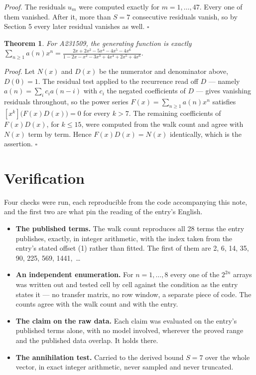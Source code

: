 \documentclass[11pt]{article}
\newtheorem{theorem}{Theorem}
\theoremstyle{definition}
\begin{document}
{\itshape Proof.} The residuals $u_m$ were computed exactly for $m = 1,\dots,47$. Every one of them vanished. After it, more than $S = 7$ consecutive residuals vanish, so by Section 5 every later residual vanishes as well. $\square$

\begin{theorem} For A231509, the generating function is exactly $\sum_{n\ge 1} a(n)x^n = \frac{2x + 2x^{2} - 5x^{4} - 4x^{5} - 4x^{6}}{1 - 2x - x^{2} - 3x^{3} + 4x^{4} + 2x^{5} + 4x^{6}}$.\end{theorem}

{\itshape Proof.} Let $N(x)$ and $D(x)$ be the numerator and denominator above, $D(0)=1$. The residual test applied to the recurrence read off $D$ --- namely $a(n) = \sum_i c_i a(n-i)$ with $c_i$ the negated coefficients of $D$ --- gives vanishing residuals throughout, so the power series $F(x)=\sum_{n\ge 1}a(n)x^n$ satisfies $[x^k]\bigl(F(x)D(x)\bigr) = 0$ for every $k > 7$. The remaining coefficients of $F(x)D(x)$, for $k \le 15$, were computed from the walk count and agree with $N(x)$ term by term. Hence $F(x)D(x) = N(x)$ identically, which is the assertion. $\square$

\section{Verification}

Four checks were run, each reproducible from the code accompanying this note, and the first two are what pin the reading of the entry's English.

\begin{itemize}

\item {\bfseries The published terms.} The walk count reproduces all 28 terms the entry publishes, exactly, in integer arithmetic, with the index taken from the entry's stated offset (1) rather than fitted. The first of them are 2, 6, 14, 35, 90, 225, 569, 1441,~\dots

\item {\bfseries An independent enumeration.} For $n = 1,\dots,8$ every one of the $2^{2n}$ arrays was written out and tested cell by cell against the condition as the entry states it --- no transfer matrix, no row window, a separate piece of code. The counts agree with the walk count and with the entry.

\item {\bfseries The claim on the raw data.} Each claim was evaluated on the entry's published terms alone, with no model involved, wherever the proved range and the published data overlap. It holds there.

\item {\bfseries The annihilation test.} Carried to the derived bound $S = 7$ over the whole vector, in exact integer arithmetic, never sampled and never truncated.

\end{itemize}
\end{document}
